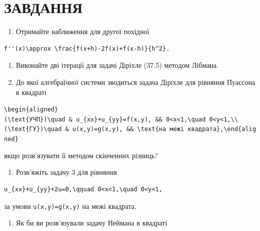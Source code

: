 \documentclass[
  ukrainian,
]{article}
\providecommand{\tightlist}{%
  \setlength{\itemsep}{0pt}\setlength{\parskip}{0pt}}
\begin{document}
\section{ЗАВДАННЯ}\label{ux437ux430ux432ux434ux430ux43dux43dux44f-9}

\begin{enumerate}
\def\labelenumi{\arabic{enumi}.}
\tightlist
\item
  Отримайте наближення для другої похідної
\end{enumerate}

\begin{verbatim}
f''(x)\approx \frac{f(x+h)-2f(x)+f(x-h)}{h^2}.
\end{verbatim}

\begin{enumerate}
\def\labelenumi{\arabic{enumi}.}
\setcounter{enumi}{1}
\item
  Виконайте дві ітерації для задачі Діріхле (37.5) методом Лібмана.
\item
  До якої алгебраїчної системи зводиться задача Діріхле для рівняння
  Пуассона в квадраті
\end{enumerate}

\texttt{\textbackslash{}begin\{aligned\}(\textbackslash{}text\{УЧП\})\textbackslash{}quad\ \&\ u\_\{xx\}+u\_\{yy\}=f(x,y),\ \&\&\ 0\textless{}x\textless{}1,\textbackslash{}quad\ 0\textless{}y\textless{}1,\textbackslash{}\textbackslash{}(\textbackslash{}text\{ГУ\})\textbackslash{}quad\ \&\ u(x,y)=g(x,y),\ \&\&\ \textbackslash{}text\{на\ межі\ квадрата\},\textbackslash{}end\{aligned\}}

якщо розв'язувати її методом скінченних різниць?

\begin{enumerate}
\def\labelenumi{\arabic{enumi}.}
\setcounter{enumi}{3}
\tightlist
\item
  Розв'яжіть задачу 3 для рівняння
\end{enumerate}

\begin{verbatim}
u_{xx}+u_{yy}+2u=0,\qquad 0<x<1,\quad 0<y<1,
\end{verbatim}

за умови \texttt{u(x,y)=g(x,y)} на межі квадрата.

\begin{enumerate}
\def\labelenumi{\arabic{enumi}.}
\setcounter{enumi}{4}
\tightlist
\item
  Як би ви розв'язували задачу Неймана в квадраті
\end{enumerate}
\end{document}
